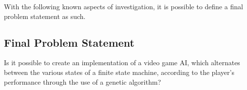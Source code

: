 With the following known aspects of investigation, it is possible to define a final problem statement as such.


\subsection{Final Problem Statement} \label{sec:finalproblemstatement}
Is it possible to create an implementation of a video game AI, which alternates between the various states of a finite state machine, according to the player's performance through the use of a genetic algorithm?
